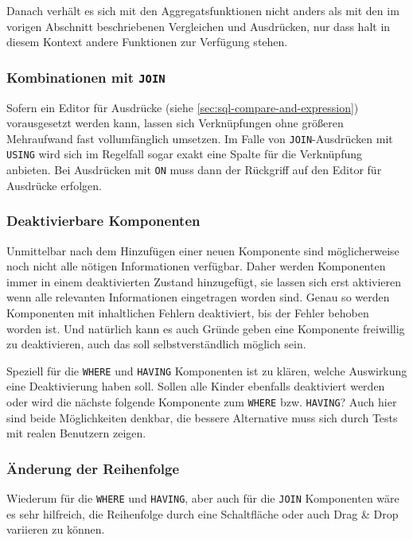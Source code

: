 \documentclass[paper=a4,fontsize=11pt,parskip=half]{scrartcl}
\begin{document}
Danach verhält es sich mit den Aggregatsfunktionen nicht anders als mit den im vorigen Abschnitt beschriebenen Vergleichen und Ausdrücken, nur dass halt in diesem Kontext andere Funktionen zur Verfügung stehen.

\subsubsection{Kombinationen mit \texttt{JOIN}}

Sofern ein Editor für Ausdrücke (siehe \ref{sec:sql-compare-and-expression}) vorausgesetzt werden kann, lassen sich Verknüpfungen ohne größeren Mehraufwand fast vollumfänglich umsetzen. Im Falle von \texttt{JOIN}-Ausdrücken mit \texttt{USING} wird sich im Regelfall sogar exakt eine Spalte für die Verknüpfung anbieten. Bei Ausdrücken mit \texttt{ON} muss dann der Rückgriff auf den Editor für Ausdrücke erfolgen.

\subsubsection{Deaktivierbare Komponenten}

Unmittelbar nach dem Hinzufügen einer neuen Komponente sind möglicherweise noch nicht alle nötigen Informationen verfügbar. Daher werden Komponenten immer in einem deaktivierten Zustand hinzugefügt, sie lassen sich erst aktivieren wenn alle relevanten Informationen eingetragen worden sind. Genau so werden Komponenten mit inhaltlichen Fehlern deaktiviert, bis der Fehler behoben worden ist. Und natürlich kann es auch Gründe geben eine Komponente freiwillig zu deaktivieren, auch das soll selbstverständlich möglich sein.

Speziell für die \texttt{WHERE} und \texttt{HAVING} Komponenten ist zu klären, welche Auswirkung eine Deaktivierung haben soll. Sollen alle Kinder ebenfalls deaktiviert werden oder wird die nächste folgende Komponente zum \texttt{WHERE} bzw. \texttt{HAVING}? Auch hier sind beide Möglichkeiten denkbar, die bessere Alternative muss sich durch Tests mit realen Benutzern zeigen.

\subsubsection{Änderung der Reihenfolge}

Wiederum für die \texttt{WHERE} und \texttt{HAVING}, aber auch für die \texttt{JOIN} Komponenten wäre es sehr hilfreich, die Reihenfolge durch eine Schaltfläche oder auch Drag \& Drop variieren zu können.
\end{document}
